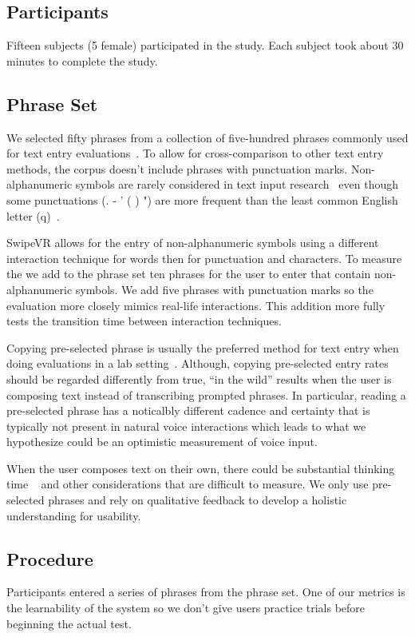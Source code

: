 \subsection{Participants}
Fifteen subjects (5 female) participated in the study.
Each subject took about 30 minutes to complete the study.

\subsection{Phrase Set}
We selected fifty phrases from a collection of five-hundred phrases commonly used for text entry evaluations~\cite{mackenzie2003phrase}.
To allow for cross-comparison to other text entry methods, the corpus doesn't include phrases with punctuation marks.
Non-alphanumeric symbols are rarely considered in text input research~\cite{mackenzie2003phrase} even though some punctuations (. - ' ( ) ") are more frequent than the least common English letter (q)~\cite{malikpunctuation}.
 
SwipeVR allows for the entry of non-alphanumeric symbols using a different interaction technique for words then for punctuation and characters.
To measure the  we add to the phrase set ten phrases for the user to enter that contain non-alphanumeric symbols.
We add five phrases with punctuation marks so the evaluation more closely mimics real-life interactions.
This addition more fully tests the transition time between interaction techniques. 

Copying pre-selected phrase is usually the preferred method for text entry when doing evaluations in a lab setting~\cite{mackenzie2002character, mackenzie2003phrase}.
Although, copying pre-selected entry rates should be regarded differently from true, ``in the wild'' results when the user is composing text instead of transcribing prompted phrases.
In particular, reading a pre-selected phrase has a noticalbly different cadence and certainty that is typically not present in natural voice interactions which leads to what we hypothesize could be an optimistic measurement of voice input.

When the user composes text on their own, there could be substantial thinking time ~\cite{shneiderman2000limits} and other considerations that are difficult to measure.
We only use pre-selected phrases and rely on qualitative feedback to develop a holistic understanding for usability.

\subsection{Procedure}
Participants entered a series of phrases from the phrase set.
One of our metrics is the learnability of the system so we don't give users practice trials before beginning the actual test.

